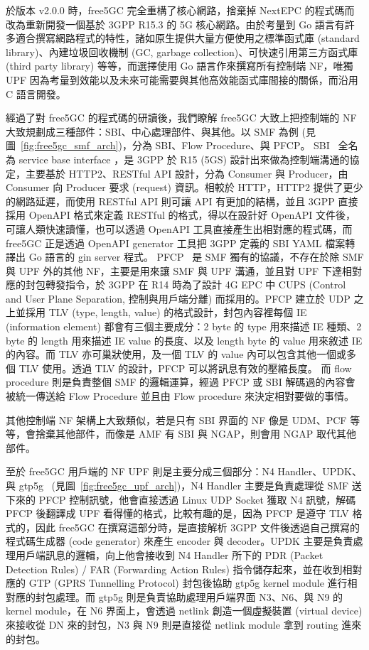 於版本 v2.0.0 時，free5GC 完全重構了核心網路，捨棄掉 NextEPC 的程式碼而改為重新開發一個基於 3GPP R15.3 的 5G 核心網路。由於考量到 Go 語言有許多適合撰寫網路程式的特性，諸如原生提供大量方便使用之標準函式庫 (standard library)、內建垃圾回收機制 (GC, garbage collection)、可快速引用第三方函式庫 (third party library) 等等，而選擇使用 Go 語言作來撰寫所有控制端 NF，唯獨 UPF 因為考量到效能以及未來可能需要與其他高效能函式庫間接的關係，而沿用 C 語言開發。

經過了對 free5GC 的程式碼的研讀後，我們瞭解 free5GC 大致上把控制端的 NF 大致規劃成三種部件：SBI、中心處理部件、與其他。以 SMF 為例 (見圖~\ref{fig:free5gc_smf_arch})，分為 SBI、Flow Procedure、與 PFCP。
SBI~\cite{3gpp.29.500} 全名為 service base interface
，是 3GPP 於 R15 (5GS) 設計出來做為控制端溝通的協定，主要基於 HTTP2、RESTful API 設計，分為 Consumer 與 Producer，由 Consumer 向 Producer 要求 (request) 資訊。相較於 HTTP，HTTP2 提供了更少的網路延遲，而使用 RESTful API 則可讓 API 有更加的結構，並且 3GPP 直接採用 OpenAPI 格式來定義 RESTful 的格式，得以在設計好 OpenAPI 文件後，可讓人類快速讀懂，也可以透過 OpenAPI 工具直接產生出相對應的程式碼，而 free5GC 正是透過 OpenAPI generator 工具把 3GPP 定義的 SBI YAML 檔案轉譯出 Go 語言的 gin server 程式。
PFCP~\cite{3gpp.29.244} 是 SMF 獨有的協議，不存在於除 SMF 與 UPF 外的其他 NF，主要是用來讓 SMF 與 UPF 溝通，並且對 UPF 下達相對應的封包轉發指令，於 3GPP 在 R14 時為了設計 4G EPC 中 CUPS (Control and User Plane Separation, 控制與用戶端分離) 而採用的。PFCP 建立於 UDP 之上並採用 TLV (type, length, value) 的格式設計，封包內容裡每個 IE (information element) 都會有三個主要成分：2 byte 的 type 用來描述 IE 種類、2 byte 的 length 用來描述 IE value 的長度、以及 length byte 的 value 用來敘述 IE 的內容。而 TLV 亦可巢狀使用，及一個 TLV 的 value 內可以包含其他一個或多個 TLV 使用。透過 TLV 的設計，PFCP 可以將訊息有效的壓縮長度。
而 flow procedure 則是負責整個 SMF 的邏輯運算，經過 PFCP 或 SBI 解碼過的內容會被統一傳送給 Flow Procedure 並且由 Flow procedure 來決定相對要做的事情。

其他控制端 NF 架構上大致類似，若是只有 SBI 界面的 NF 像是 UDM、PCF 等等，會捨棄其他部件，而像是 AMF 有 SBI 與 NGAP，則會用 NGAP 取代其他部件。

至於 free5GC 用戶端的 NF UPF 則是主要分成三個部分：N4 Handler、UPDK、與 gtp5g~\cite{gtp5g} (見圖~\ref{fig:free5gc_upf_arch})，N4 Handler 主要是負責處理從 SMF 送下來的 PFCP 控制訊號，他會直接透過 Linux UDP Socket 獲取 N4 訊號，解碼 PFCP 後翻譯成 UPF 看得懂的格式，比較有趣的是，因為 PFCP 是遵守 TLV 格式的，因此 free5GC 在撰寫這部分時，是直接解析 3GPP 文件後透過自己撰寫的程式碼生成器 (code generator) 來產生 encoder 與 decoder。UPDK 主要是負責處理用戶端訊息的邏輯，向上他會接收到 N4 Handler 所下的 PDR (Packet Detection Rules) / FAR (Forwarding Action Rules) 指令儲存起來，並在收到相對應的 GTP (GPRS Tunnelling Protocol) 封包後協助 gtp5g kernel module 進行相對應的封包處理。而 gtp5g 則是負責協助處理用戶端界面 N3、N6、與 N9 的 kernel module，在 N6 界面上，會透過 netlink 創造一個虛擬裝置 (virtual device) 來接收從 DN 來的封包，N3 與 N9 則是直接從 netlink module 拿到 routing 進來的封包。

